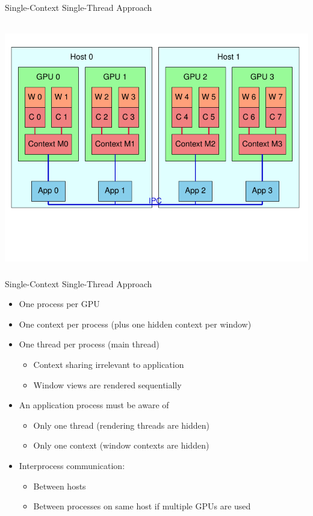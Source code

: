\documentclass[utf8,stillsansserifmath,fleqn,t]{beamer}
\begin{document}
\begin{frame}
\frametitle{\insertsection}
\centerline{Single-Context Single-Thread Approach}~\\
\includegraphics[height=.75\textheight]{./fig/setup-vr-scst.pdf}
\end{frame}

\begin{frame}
\frametitle{\insertsection}
Single-Context Single-Thread Approach
\begin{itemize}
\item One process per GPU
\item One context per process (plus one hidden context per window)
\item One thread per process (main thread)
    \begin{itemize}
    \item Context sharing irrelevant to application
    \item Window views are rendered sequentially
    \end{itemize}
\item An application process must be aware of
    \begin{itemize}
    \item Only one thread (rendering threads are hidden)
    \item Only one context (window contexts are hidden)
    \end{itemize}
\item Interprocess communication:
    \begin{itemize}
    \item Between hosts
    \item Between processes on same host if multiple GPUs are used
    \end{itemize}
\end{itemize}
\end{frame}
\end{document}
